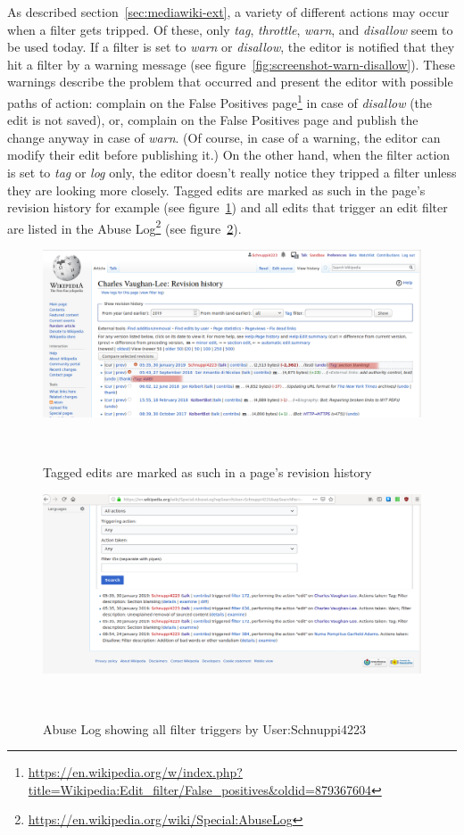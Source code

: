 As described section~\ref{sec:mediawiki-ext}, a variety of different actions may occur when a filter gets tripped.
Of these, only \emph{tag}, \emph{throttle}, \emph{warn}, and \emph{disallow} seem to be used today.
If a filter is set to \emph{warn} or \emph{disallow}, the editor is notified that they hit a filter by a warning message (see figure~\ref{fig:screenshot-warn-disallow}).
These warnings describe the problem that occurred and present the editor with possible paths of action:
complain on the False Positives page\footnote{\url{https://en.wikipedia.org/w/index.php?title=Wikipedia:Edit_filter/False_positives&oldid=879367604}} in case of \emph{disallow} (the edit is not saved),
or, complain on the False Positives page and publish the change anyway in case of \emph{warn}.
(Of course, in case of a warning, the editor can modify their edit before publishing it.)
On the other hand, when the filter action is set to \emph{tag} or \emph{log} only, the editor doesn't really notice they tripped a filter unless they are looking more closely.
Tagged edits are marked as such in the page's revision history for example (see figure~\ref{fig:tags-in-history})
and all edits that trigger an edit filter are listed in the Abuse Log\footnote{\url{https://en.wikipedia.org/wiki/Special:AbuseLog}} (see figure~\ref{fig:screenshot-abuse-log}).

\begin{figure}
\centering
  \includegraphics[width=0.9\columnwidth]{pics/screenshots-filter-trigger/Screenshot-tags-in-revision-history.png}
  \caption{Tagged edits are marked as such in a page's revision history}~\label{fig:tags-in-history}
\end{figure}

\begin{figure}
\centering
  \includegraphics[width=0.9\columnwidth]{pics/screenshots-filter-trigger/Screenshot-abuse-log.png}
  \caption{Abuse Log showing all filter triggers by User:Schnuppi4223}~\label{fig:screenshot-abuse-log}
\end{figure}

